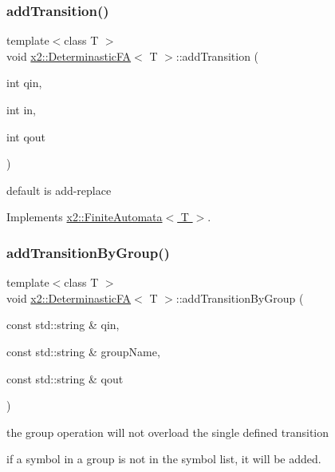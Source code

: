 \subsubsection{\texorpdfstring{add\+Transition()}{addTransition()}}
{\footnotesize\ttfamily template$<$class T $>$ \\
void \hyperlink{classx2_1_1_determinastic_f_a}{x2\+::\+Determinastic\+FA}$<$ T $>$\+::add\+Transition (\begin{DoxyParamCaption}\item[{int}]{qin,  }\item[{int}]{in,  }\item[{int}]{qout }\end{DoxyParamCaption})\hspace{0.3cm}{\ttfamily [virtual]}}

default is add-\/replace 

Implements \hyperlink{classx2_1_1_finite_automata_ac8f011bb86cb9e47370274ae200fc769}{x2\+::\+Finite\+Automata$<$ T $>$}.

\mbox{\label{classx2_1_1_determinastic_f_a_a28c9f0dc652f38e8a08d67e2d911d56d}} 
\subsubsection{\texorpdfstring{add\+Transition\+By\+Group()}{addTransitionByGroup()}}
{\footnotesize\ttfamily template$<$class T $>$ \\
void \hyperlink{classx2_1_1_determinastic_f_a}{x2\+::\+Determinastic\+FA}$<$ T $>$\+::add\+Transition\+By\+Group (\begin{DoxyParamCaption}\item[{const std\+::string \&}]{qin,  }\item[{const std\+::string \&}]{group\+Name,  }\item[{const std\+::string \&}]{qout }\end{DoxyParamCaption})\hspace{0.3cm}{\ttfamily [inline]}}

the group operation will not overload the single defined transition

if a symbol in a group is not in the symbol list, it will be added. \mbox{\label{classx2_1_1_determinastic_f_a_a830e6d1612b263d9ef126b29709f4c46}} 
